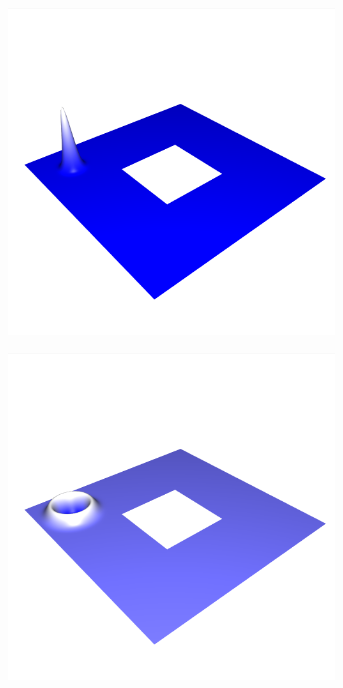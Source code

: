\documentclass[crop=false,10pt,ngerman]{standalone}
\begin{document}
      \begin{figure}[h]
        \center
        \begin{subfigure}[b]{0.24\textwidth}
          \center
          \includegraphics[trim={0.9cm 1.8cm 0.5cm 5cm},clip,width=0.95\textwidth]{images/ring_wave_0.png}
          \caption{}
        \end{subfigure}
        \begin{subfigure}[b]{0.24\textwidth}
          \center
          \includegraphics[trim={0.9cm 1.8cm 0.5cm 5cm},clip,width=0.95\textwidth]{images/ring_wave_1.png}

\end{subfigure}
\end{figure}
\end{document}
